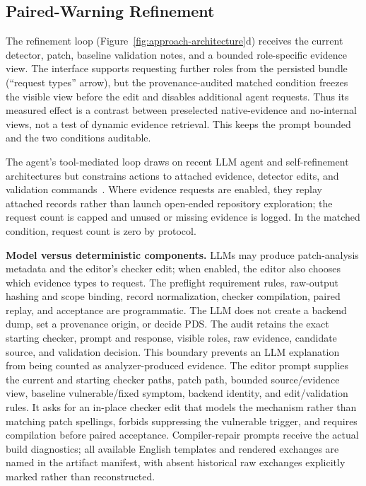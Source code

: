 \subsection{Paired-Warning Refinement}
\label{sec:refinement}

The refinement loop (Figure~\ref{fig:approach-architecture}d) receives the current detector, patch, baseline validation notes, and a bounded role-specific evidence view.  The interface supports requesting further roles from the persisted bundle (``request types'' arrow), but the provenance-audited matched condition freezes the visible view before the edit and disables additional agent requests.  Thus its measured effect is a contrast between preselected native-evidence and no-internal views, not a test of dynamic evidence retrieval.  This keeps the prompt bounded and the two conditions auditable.

The agent's tool-mediated loop draws on recent LLM agent and self-refinement architectures but constrains actions to attached evidence, detector edits, and validation commands~\cite{madaan2023selfrefine,shinn2023reflexion,yao2023react,schick2023toolformer}.  Where evidence requests are enabled, they replay attached records rather than launch open-ended repository exploration; the request count is capped and unused or missing evidence is logged.  In the matched condition, request count is zero by protocol.

\textbf{Model versus deterministic components.}  LLMs may produce patch-analysis metadata and the editor's checker edit; when enabled, the editor also chooses which evidence types to request.  The preflight requirement rules, raw-output hashing and scope binding, record normalization, checker compilation, paired replay, and acceptance are programmatic.  The LLM does not create a backend dump, set a provenance origin, or decide PDS.  The audit retains the exact starting checker, prompt and response, visible roles, raw evidence, candidate source, and validation decision.  This boundary prevents an LLM explanation from being counted as analyzer-produced evidence.
The editor prompt supplies the current and starting checker paths, patch path, bounded source/evidence view, baseline vulnerable/fixed symptom, backend identity, and edit/validation rules.  It asks for an in-place checker edit that models the mechanism rather than matching patch spellings, forbids suppressing the vulnerable trigger, and requires compilation before paired acceptance.  Compiler-repair prompts receive the actual build diagnostics; all available English templates and rendered exchanges are named in the artifact manifest, with absent historical raw exchanges explicitly marked rather than reconstructed.

